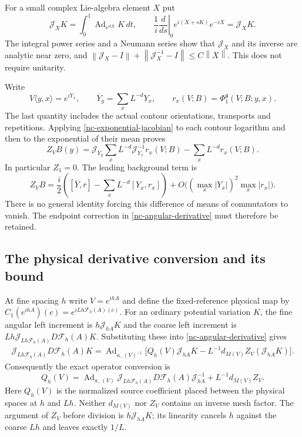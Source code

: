 \documentclass[11pt]{article}
\theoremstyle{remark}\newtheorem{remark}[theorem]{Remark}
\newcommand{\norm}[1]{\left\lVert#1\right\rVert}
\begin{document}
For a small complex Lie-algebra element $X$ put
\begin{equation}
 \mathcal J_XK=\int_0^1\operatorname{Ad}_{e^{itX}}K\,dt,
 \qquad
 \frac1i\left.\frac d{ds}\right|_0e^{i(X+sK)}e^{-iX}
           =\mathcal J_XK.
 \label{nc-exponential-jacobian}
\end{equation}
The integral power series and a Neumann series show that
$\mathcal J_X$ and its inverse are analytic near zero, and
$\norm{\mathcal J_X-I}+\norm{\mathcal J_X^{-1}-I}\le C\norm{X}$.
This does not require unitarity.

Write
\[
 V\langle y,x\rangle=e^{iY_x},\qquad
 \overline Y_y=\sum_xL^{-d}Y_x,\qquad
 r_x(V;B)=\Phi_1^{\mathfrak g}(V;B;y,x).
\]
The last quantity includes the actual contour orientations,
transports and repetitions. Applying
\eqref{nc-exponential-jacobian} to each contour logarithm and then
to the exponential of their mean proves
\begin{equation}
 Z_VB(y)=\mathcal J_{\overline Y_y}
       \sum_xL^{-d}\mathcal J_{Y_x}^{-1}r_x(V;B)
          -\sum_xL^{-d}r_x(V;B).
 \label{nc-Z-formula}
\end{equation}
In particular $Z_1=0$. The leading background term is
\[
 Z_VB=\frac i2\left(
   [\overline Y,\overline r]-\sum_xL^{-d}[Y_x,r_x]\right)
   +O\bigl((\max_x|Y_x|)^2\max_x|r_x|\bigr).
\]
There is no general identity forcing this difference of means of
commutators to vanish. The endpoint correction in
\eqref{nc-angular-derivative} must therefore be retained.

\subsection{The physical derivative conversion and its bound}
\label{nc-physical}

At fine spacing $h$ write $V=e^{ihA}$ and define the fixed-reference
physical map by
$C_1(e^{ihA})(c)=e^{iLh\mathcal F_h(A)(c)}$. For an ordinary
potential variation $K$, the fine angular left increment is
$h\mathcal J_{hA}K$ and the coarse left increment is
$Lh\mathcal J_{Lh\mathcal F_h(A)}D\mathcal F_h(A)K$.
Substituting these into \eqref{nc-angular-derivative} gives
\begin{equation}
 \begin{split}
 \mathcal J_{Lh\mathcal F_h(A)}D\mathcal F_h(A)K
 =\operatorname{Ad}_{a_-(V)^{-1}}\bigl[
 Q_h(V)\mathcal J_{hA}K
  -L^{-1}d_{M(V)}Z_V(\mathcal J_{hA}K)\bigr].
 \end{split}
 \label{nc-physical-unrearranged}
\end{equation}
Consequently the exact operator conversion is
\begin{equation}
 \boxed{\displaystyle
 Q_h(V)=\operatorname{Ad}_{a_-(V)}
   \mathcal J_{Lh\mathcal F_h(A)}D\mathcal F_h(A)
        \mathcal J_{hA}^{-1}+L^{-1}d_{M(V)}Z_V.}
 \label{nc-physical-conversion}
\end{equation}
Here $Q_h(V)$ is the normalized source coefficient placed between
the physical spaces at $h$ and $Lh$. Neither $d_{M(V)}$ nor $Z_V$
contains an inverse mesh factor. The argument of $Z_V$ before
division is $h\mathcal J_{hA}K$; its linearity cancels $h$ against
the coarse $Lh$ and leaves exactly $1/L$.
\end{document}
